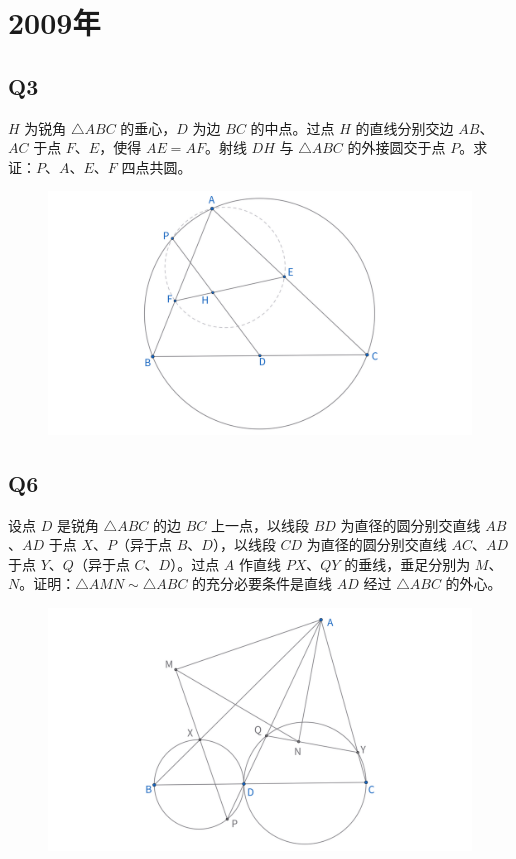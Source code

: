 \documentclass{article}
\begin{document}
\newpage
\section{2009年}
\subsection{Q3}
$H$ 为锐角 $\triangle ABC$ 的垂心，$D$ 为边 $BC$ 的中点。过点 $H$ 的直线分别交边 $AB$、$AC$ 于点 $F$、$E$，使得 $AE = AF$。射线 $DH$ 与 $\triangle ABC$ 的外接圆交于点 $P$。求证：$P$、$A$、$E$、$F$ 四点共圆。
\begin{figure}[htbp]
	\centering
	\includegraphics[width=0.8\linewidth]{figures/西部赛09年Q3.png}
\end{figure}

\subsection{Q6}
设点 $D$ 是锐角 $\triangle ABC$ 的边 $BC$ 上一点，以线段 $BD$ 为直径的圆分别交直线 $AB$、$AD$ 于点 $X$、$P$（异于点 $B$、$D$），以线段 $CD$ 为直径的圆分别交直线 $AC$、$AD$ 于点 $Y$、$Q$（异于点 $C$、$D$）。过点 $A$ 作直线 $PX$、$QY$ 的垂线，垂足分别为 $M$、$N$。证明：$\triangle AMN \sim \triangle ABC$ 的充分必要条件是直线 $AD$ 经过 $\triangle ABC$ 的外心。
\begin{figure}[htbp]
	\centering
	\includegraphics[width=0.8\linewidth]{figures/西部赛09年Q6.png}
\end{figure}
\end{document}
